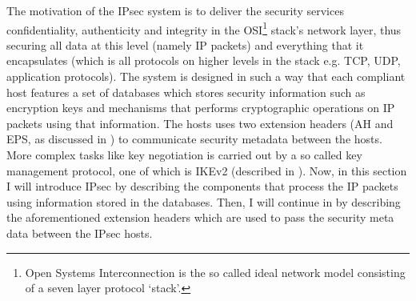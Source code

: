 \documentclass[final,a4paper,twoside,11pt,onecolumn]{report}
\begin{document}
The motivation of the IPsec system is to deliver the security services confidentiality, authenticity and integrity in the OSI\footnote{Open Systems Interconnection is the so called ideal network model consisting of a seven layer protocol `stack'.}  stack's network layer, thus securing all data at this level (namely IP packets) and everything that it encapsulates (which is all protocols on higher levels in the stack e.g. TCP, UDP, application protocols). The system is designed in such a way that each compliant host features a set of databases which stores security information such as encryption keys and mechanisms that performs cryptographic operations on IP packets using that information. The hosts uses two extension headers (AH and EPS, as discussed in ) to communicate security metadata between the hosts. More complex tasks like key negotiation is carried out by a so called key management protocol, one of which is IKEv2 (described in ). Now, in this section I will introduce IPsec by describing the components that process the IP packets using information stored in the databases. Then, I will continue in  by describing the aforementioned extension headers which are used to pass the security meta data between the IPsec hosts.

\end{document}
